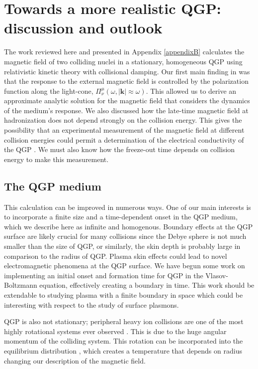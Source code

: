 
\section{Towards a more realistic QGP: discussion and outlook }\label{sec:ConclusionsQGP}
The work reviewed here and presented in Appendix \ref{appendixB} calculates the magnetic field of two colliding nuclei in a stationary, homogeneous QGP using relativistic kinetic theory with collisional damping. Our first main finding in \cite{Grayson:2022asf} was that the response to the external magnetic field is controlled by the polarization function along the light-cone, $\Pi^\mu_\nu(\omega ,|\boldsymbol{k}|\approx\omega)$. This allowed us to derive an approximate analytic solution for the magnetic field that considers the dynamics of the medium's response. We also discussed how the late-time magnetic field at hadronization does not depend strongly on the collision energy. This gives the possibility that an experimental measurement of the magnetic field at different collision energies could permit a determination of the electrical conductivity of the QGP \cite{PhysRevX.14.011028}. We must also know how the freeze-out time depends on collision energy to make this measurement.

\subsection{The QGP medium}
This calculation can be improved in numerous ways. One of our main interests is to incorporate a finite size and a time-dependent onset in the QGP medium, which we describe here as infinite and homogenous. Boundary effects at the QGP surface are likely crucial for many collisions since the Debye sphere is not much smaller than the size of QGP, or similarly, the skin depth is probably large in comparison to the radius of QGP. Plasma skin effects could lead to novel electromagnetic phenomena at the QGP surface. We have begun some work on implementing an initial onset and formation time for QGP in the Vlasov-Boltzmann equation, effectively creating a boundary in time. This work should be extendable to studying plasma with a finite boundary in space which could be interesting with respect to the study of surface plasmons.

QGP is also not stationary; peripheral heavy ion collisions are one of the most highly rotational systems ever observed \cite{PhysRevC.87.034906,PhysRevC.93.064907,PhysRevC.94.044910,doi:10.1146/annurev-nucl-021920-095245}. This is due to the huge angular momentum of the colliding system. This rotation can be incorporated into the equilibrium distribution \cite{Hakim2011}, which creates a temperature that depends on radius \cite{chernikov1964equilibrium} changing our description of the magnetic field.

